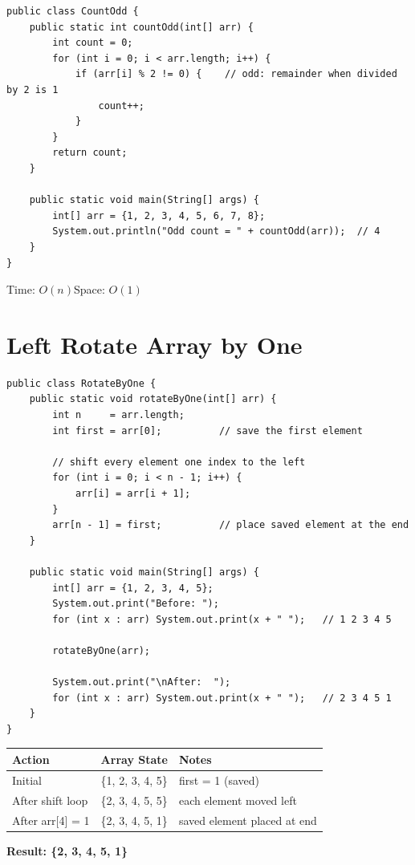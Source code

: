 \documentclass[12pt,a4paper,oneside]{book}
\begin{document}
\begin{lstlisting}[caption={Count all odd elements}]
public class CountOdd {
    public static int countOdd(int[] arr) {
        int count = 0;
        for (int i = 0; i < arr.length; i++) {
            if (arr[i] % 2 != 0) {    // odd: remainder when divided by 2 is 1
                count++;
            }
        }
        return count;
    }

    public static void main(String[] args) {
        int[] arr = {1, 2, 3, 4, 5, 6, 7, 8};
        System.out.println("Odd count = " + countOdd(arr));  // 4
    }
}
\end{lstlisting}

\begin{complexity}
Time: $O(n)$\quad Space: $O(1)$
\end{complexity}

\section{Left Rotate Array by One}

\begin{lstlisting}[caption={Left Rotate by One Position}]
public class RotateByOne {
    public static void rotateByOne(int[] arr) {
        int n     = arr.length;
        int first = arr[0];          // save the first element

        // shift every element one index to the left
        for (int i = 0; i < n - 1; i++) {
            arr[i] = arr[i + 1];
        }
        arr[n - 1] = first;          // place saved element at the end
    }

    public static void main(String[] args) {
        int[] arr = {1, 2, 3, 4, 5};
        System.out.print("Before: ");
        for (int x : arr) System.out.print(x + " ");   // 1 2 3 4 5

        rotateByOne(arr);

        System.out.print("\nAfter:  ");
        for (int x : arr) System.out.print(x + " ");   // 2 3 4 5 1
    }
}
\end{lstlisting}

\begin{dryrun}[Dry Run: arr = \{1, 2, 3, 4, 5\}]
\begin{center}
\begin{tabular}{lll}
\toprule
\textbf{Action} & \textbf{Array State} & \textbf{Notes}\\
\midrule
Initial             & \{1, 2, 3, 4, 5\} & first = 1 (saved)\\
After shift loop    & \{2, 3, 4, 5, 5\} & each element moved left\\
After arr[4] = 1    & \{2, 3, 4, 5, 1\} & saved element placed at end\\
\bottomrule
\end{tabular}
\end{center}
\textbf{Result: \{2, 3, 4, 5, 1\}}
\end{dryrun}
\end{document}
